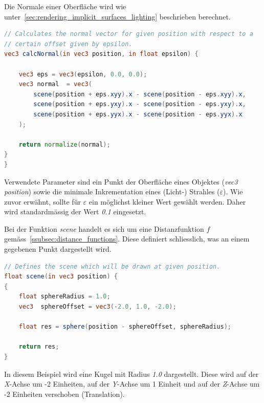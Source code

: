 Die Normale einer Oberfläche wird wie
unter~\autoref{sec:rendering_implicit_surfaces_lighting} beschrieben
berechnet.

\begin{minipage}{\linewidth}
\begin{lstlisting}[language=GLSL,caption={Berechnung der Normalen einer
        impliziten Oberfläche in
        GLSL.},label={alg:glsl_normal},captionpos=b,emph={calcNormal}]
// Calculates the normal vector for given position with respect to a
// certain offset given by epsilon.
vec3 calcNormal(in vec3 position, in float epsilon) {

    vec3 eps = vec3(epsilon, 0.0, 0.0);
    vec3 normal  = vec3(
        scene(position + eps.xyy).x - scene(position - eps.xyy).x,
        scene(position + eps.yxy).x - scene(position - eps.yxy).x,
        scene(position + eps.yyx).x - scene(position - eps.yyx).x
    );

    return normalize(normal);
}
}
\end{lstlisting}
\end{minipage}

Verwendete Parameter sind ein Punkt der Oberfläche eines Objektes
(\textit{vec3 position}) sowie die minimale Inkrementation eines
(Licht-) Strahles ($\varepsilon$). Wie zuvor erwähnt, sollte
für $\varepsilon$ ein möglichst kleiner Wert gewählt werden. Daher wird
standardmässig der Wert \textit{0.1} eingesetzt.

Bei der Funktion \textit{scene} handelt es sich um eine Distanzfunktion
$f$ gemäss~\autoref{ssubsec:distance_functions}. Diese definiert
schliesslich, was an einem gegebenen Punkt dargestellt wird.

\begin{minipage}{\linewidth}
\begin{lstlisting}[language=GLSL,caption={Distanzfunktion $f$ in
        GLSL.},label={alg:glsl_distance_func},captionpos=b,emph={scene}]
// Defines the scene which will be drawn at given position.
float scene(in vec3 position) {
{
    float sphereRadius = 1.0;
    vec3  sphereOffset = vec3(-2.0, 1.0, -2.0);

    float res = sphere(position - sphereOffset, sphereRadius);

    return res;
}
\end{lstlisting}
\end{minipage}

In diesem Beispiel wird eine Kugel mit Radius \textit{1.0} dargestellt.
Diese wird auf der \textit{X}-Achse um -2 Einheiten, auf der
\textit{Y}-Achse um 1 Einheit und auf der \textit{Z}-Achse um -2
Einheiten verschoben (Translation).

